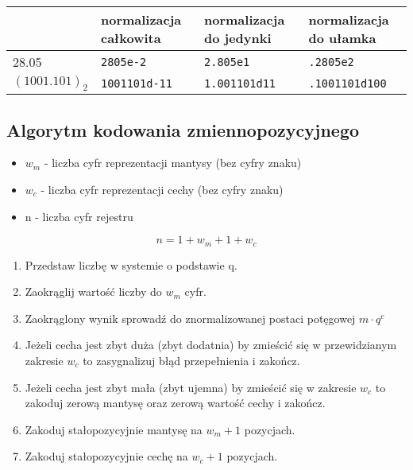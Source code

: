 \documentclass[main.tex]{subfiles}
\begin{document}
    \begin{table}[H]
        \centering
        \begin{tabular}{l|l|l|l}
            & normalizacja
            całkowita & normalizacja
            do jedynki & normalizacja
            do ułamka  \\
            \hline
            28.05 & \texttt{2805e-2}                & \texttt{2.805e1}                  & \texttt{.2805e2}                  \\
            $(1001.101)_2$    & \texttt{1001101d-11}             & \texttt{1.001101d11}              & \texttt{.1001101d100}             \\
        \end{tabular}
    \end{table}

    \subsection{Algorytm kodowania zmiennopozycyjnego}
    \begin{itemize}[noitemsep]
        \item $w_m$ - liczba cyfr reprezentacji mantysy (bez cyfry znaku)
        \item $w_c$ - liczba cyfr reprezentacji cechy (bez cyfry znaku)
        \item n - liczba cyfr rejestru
    \end{itemize}
    \[ n = 1 + w_m + 1 + w_c \]

    \begin{enumerate}[noitemsep]
        \item Przedstaw liczbę w systemie o podstawie q.
        \item Zaokrąglij wartość liczby do $w_m$ cyfr.
        \item Zaokrąglony wynik sprowadź do znormalizowanej postaci
        potęgowej $m\cdot q^c$
        \item Jeżeli cecha jest zbyt duża (zbyt dodatnia) by zmieścić się
        w przewidzianym zakresie $w_c$ to zasygnalizuj błąd przepełnienia i zakończ.
        \item Jeżeli cecha jest zbyt mała (zbyt ujemna) by zmieścić się
        w zakresie $w_c$ to zakoduj zerową mantysę oraz zerową wartość cechy i zakończ.
        \item Zakoduj stałopozycyjnie mantysę na $w_m + 1$ pozycjach.
        \item Zakoduj stałopozycyjnie cechę na $w_c + 1$ pozycjach.
    \end{enumerate}
\end{document}
